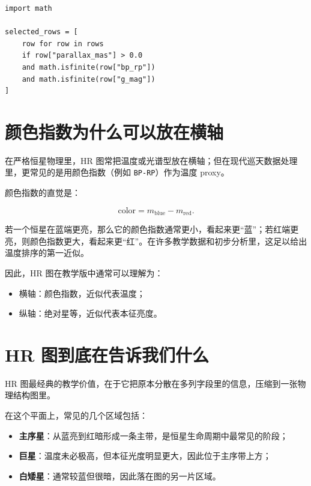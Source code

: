 \begin{examplebox}[HR 图前的最小筛选]
\begin{lstlisting}[style=pythonstyle]
import math

selected_rows = [
    row for row in rows
    if row["parallax_mas"] > 0.0
    and math.isfinite(row["bp_rp"])
    and math.isfinite(row["g_mag"])
]
\end{lstlisting}
\end{examplebox}

\section{颜色指数为什么可以放在横轴}

在严格恒星物理里，HR 图常把温度或光谱型放在横轴；但在现代巡天数据处理里，更常见的是用颜色指数（例如 \texttt{BP-RP}）作为温度 proxy。

颜色指数的直觉是：

\[
\mathrm{color} = m_{\mathrm{blue}} - m_{\mathrm{red}}.
\]

若一个恒星在蓝端更亮，那么它的颜色指数通常更小，看起来更“蓝”；若红端更亮，则颜色指数更大，看起来更“红”。在许多教学数据和初步分析里，这足以给出温度排序的第一近似。

因此，HR 图在教学版中通常可以理解为：

\begin{itemize}
    \item 横轴：颜色指数，近似代表温度；
    \item 纵轴：绝对星等，近似代表本征亮度。
\end{itemize}

\section{HR 图到底在告诉我们什么}

HR 图最经典的教学价值，在于它把原本分散在多列字段里的信息，压缩到一张物理结构图里。

在这个平面上，常见的几个区域包括：

\begin{itemize}
    \item \textbf{主序星}：从蓝亮到红暗形成一条主带，是恒星生命周期中最常见的阶段；
    \item \textbf{巨星}：温度未必极高，但本征光度明显更大，因此位于主序带上方；
    \item \textbf{白矮星}：通常较蓝但很暗，因此落在图的另一片区域。
\end{itemize}

